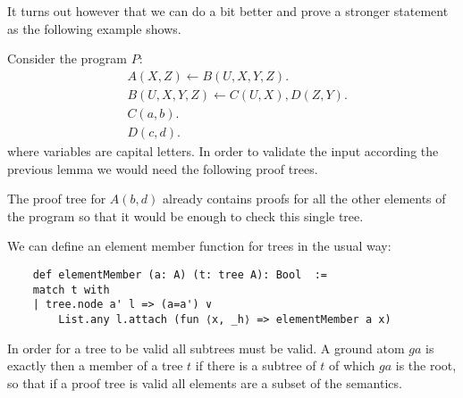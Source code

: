 It turns out however that we can do a bit better and prove a stronger statement as the following example shows.
\begin{example}
    Consider the program $P:$
    \begin{align*}
        & A(X, Z) \leftarrow B(U, X, Y, Z). \\
        & B(U, X, Y, Z) \leftarrow C(U, X), D(Z, Y). \\
        & C(a,b). \\
        & D(c,d).
        \end{align*}
    where variables are capital letters. In order to validate the input according the previous lemma we would need the following proof trees.





    The proof tree for $A(b,d)$ already contains proofs for all the other elements of the program so that it would be enough to check this single tree.
\end{example}

We can define an element member function for trees in the usual way:

\begin{lstlisting}
    def elementMember (a: A) (t: tree A): Bool  :=
    match t with
    | tree.node a' l => (a=a') ∨
        List.any l.attach (fun ⟨x, _h⟩ => elementMember a x)
\end{lstlisting}
In order for a tree to be valid all subtrees must be valid. A ground atom $ga$ is exactly then a member of a tree $t$ if there is a subtree of $t$ of which $ga$ is the root, so that if a proof tree is valid all elements are a subset of the semantics.

